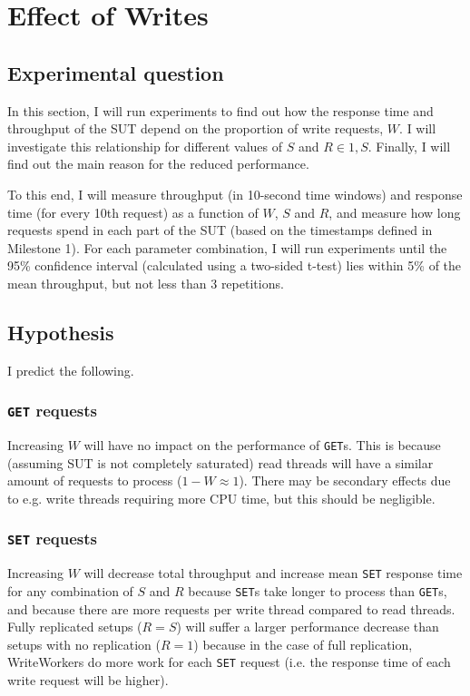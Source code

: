 \documentclass[11pt]{article}
\newcommand{\get}[0]{\texttt{GET}}
\newcommand{\set}[0]{\texttt{SET}}
\begin{document}
 \clearpage
\section{Effect of Writes}
\label{sec:exp3}

\subsection{Experimental question}

In this section, I will run experiments to find out how the response time and throughput of the SUT depend on the proportion of write requests, $W$. I will investigate this relationship for different values of $S$ and $R \in {1, S}$. Finally, I will find out the main reason for the reduced performance.

To this end, I will measure throughput (in 10-second time windows) and response time (for every 10th request) as a function of $W$, $S$ and $R$, and measure how long requests spend in each part of the SUT (based on the timestamps defined in Milestone 1). For each parameter combination, I will run experiments until the 95\% confidence interval (calculated using a two-sided t-test) lies within 5\% of the mean throughput, but not less than 3 repetitions.

\subsection{Hypothesis}

I predict the following.

\subsubsection{\get{} requests}
Increasing $W$ will have no impact on the performance of \get{}s. This is because (assuming SUT is not completely saturated) read threads will have a similar amount of requests to process ($1-W \approx 1$). There may be secondary effects due to e.g. write threads requiring more CPU time, but this should be negligible.

\subsubsection{\set{} requests}
Increasing $W$ will decrease total throughput and increase mean \set{} response time for any combination of $S$ and $R$ because \set{}s take longer to process than \get{}s, and because there are more requests per write thread compared to read threads. Fully replicated setups ($R=S$) will suffer a larger performance decrease than setups with no replication ($R=1$) because in the case of full replication, WriteWorkers do more work for each \set{} request (i.e. the response time of each write request will be higher).
\end{document}
